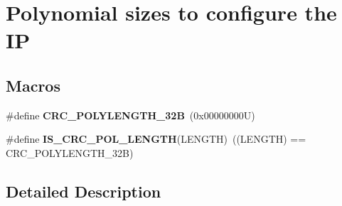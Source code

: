 \hypertarget{group___c_r_c_ex___polynomial___sizes}{}\section{Polynomial sizes to configure the IP}
\label{group___c_r_c_ex___polynomial___sizes}
\subsection*{Macros}
\begin{DoxyCompactItemize}
\item 
\mbox{\label{group___c_r_c_ex___polynomial___sizes_ga48296f63c36de0607cee59ef3c839619}} 
\#define {\bfseries C\+R\+C\+\_\+\+P\+O\+L\+Y\+L\+E\+N\+G\+T\+H\+\_\+32B}~(0x00000000\+U)
\item 
\mbox{\label{group___c_r_c_ex___polynomial___sizes_gad7ce4941893a7a73fc943153fd7adbca}} 
\#define {\bfseries I\+S\+\_\+\+C\+R\+C\+\_\+\+P\+O\+L\+\_\+\+L\+E\+N\+G\+TH}(L\+E\+N\+G\+TH)~((L\+E\+N\+G\+TH) == C\+R\+C\+\_\+\+P\+O\+L\+Y\+L\+E\+N\+G\+T\+H\+\_\+32B)
\end{DoxyCompactItemize}


\subsection{Detailed Description}
